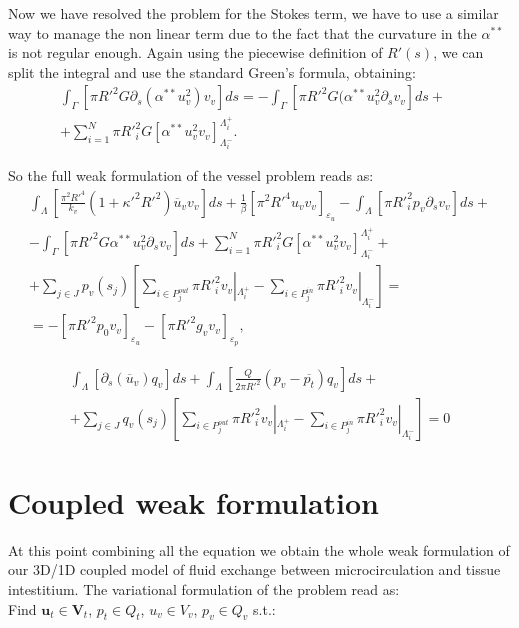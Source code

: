 \documentclass[a4paper]{report}
\begin{document}
Now we have resolved the problem for the Stokes term, we have to use a similar way to manage the non linear term due to the fact that the curvature in the $\alpha^{**}$ is not regular enough.
Again using the piecewise definition of $R'(s)$, we can split the integral and use the standard Green's formula, obtaining:
\begin{equation}
\begin{split}
\int_{\Gamma}[\pi R'^2 G \partial_s(\alpha^{**} u_v^2) v_v]ds= -\int_{\Gamma}[\pi R'^2 G (\alpha^{**} u_v^2  \partial_s v_v]ds+\quad \\ +\sum^N_{i=1}\pi R'^2_i G [\alpha^{**} u_v^2 v_v]^{\Lambda_i^+}_{\Lambda_i^-}.
\end{split}
\end{equation}

So the full weak formulation of the vessel problem reads as:
\begin{multline}
\int_{\Lambda} [\frac{\pi^2 R'^4}{k_v}(1+\kappa'^2 R'^2) \overline{u}_v v_v]ds + \frac{1}{\beta}[\pi^2 R'^4 u_v v_v]_{\varepsilon_u}-\int_{\Lambda} [\pi R'^2_i  p_v \partial_s v_v]ds +\\ -\int_{\Gamma}[\pi R'^2 G \alpha^{**} u_v^2  \partial_s v_v]ds+\sum^N_{i=1}\pi R'^2_i G [\alpha^{**} u_v^2 v_v]^{\Lambda_i^+}_{\Lambda_i^-}+\\+ \sum_{j \in J }p_v(s_j)[\sum_{i \in P_j^{out}} \pi R'^2_i v_v|_{\Lambda_i^+}-\sum_{i \in P_j^{in}} \pi R'^2_i v_v|_{\Lambda_i^-}]=\\=-[\pi R'^2 p_0 v_v]_{\varepsilon_u}-[\pi R'^2 g_v v_v]_{\varepsilon_p},
\end{multline}

\begin{multline}
\int_{\Lambda}[\partial_{s} ( \overline{u}_v)q_v ]ds+\int_{\Lambda} [\frac{Q}{2 \pi R'^2} (p_v - \overline{p_t})q_v] ds+\\+
\sum_{j \in J} q_v(s_j)[\sum_{i \in P_j^{out}} \pi R'^2_i v_v|_{\Lambda_i^+}-\sum_{i \in P_j^{in}} \pi R'^2_i v_v|_{\Lambda_i^-} ]=0
\end{multline}




\section{Coupled weak formulation}
At this point combining all the equation we obtain the whole weak formulation of our 3D/1D coupled model of fluid exchange between microcirculation and tissue intestitium. The variational formulation of the problem read as:\\
Find $\mathbf{u}_t \in \mathbf{V}_t$, $p_t \in Q_t $, $u_v \in V_v$, $p_v \in Q_v$ s.t.:
\end{document}
